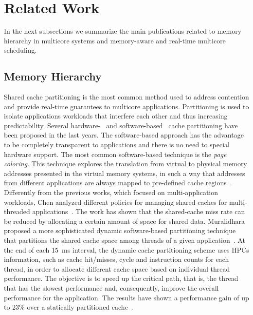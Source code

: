 \documentclass[conference]{IEEEtran}
\begin{document}
\section{Related Work}
\label{sec:related}

In the next subsections we summarize the main publications related to memory hierarchy in multicore systems and memory-aware and real-time multicore scheduling.

\subsection{Memory Hierarchy}

Shared cache partitioning is the most common method used to address contention and provide real-time guarantees to multicore applications. Partitioning is used to isolate applications workloads that interfere each other and thus increasing predictability. Several hardware-~\cite{Suhendra2008} and software-based~\cite{Cho:2006b, Zhang:2009, Muralidhara:2010} cache partitioning have been proposed in the last years. The software-based approach has the advantage to be completely transparent to applications and there is no need to special hardware support. The most common software-based technique is the \emph{page coloring}. This technique explores the translation from virtual to physical memory addresses presented in the virtual memory systems, in such a way that addresses from different applications are always mapped to pre-defined cache regions~\cite{Liedtke:1997, Cho:2006b}. Differently from the previous works, which focused on multi-application workloads, Chen analyzed different policies for managing shared caches for multi-threaded applications~\cite{YuChen:2009}. The work has shown that the shared-cache miss rate can be reduced by allocating a certain amount of space for shared data. Muralidhara proposed a more sophisticated dynamic software-based partitioning technique that partitions the shared cache space among threads of a given application~\cite{Muralidhara:2010}. At the end of each 15~ms interval, the dynamic cache partitioning scheme uses HPCs information, such as cache hit/misses, cycle and instruction counts for each thread, in order to allocate different cache space based on individual thread performance. The objective is to speed up the critical path, that is, the thread that has the slowest performance and, consequently, improve the overall performance for the application. The results have shown a performance gain of up to 23\% over a statically partitioned cache~\cite{Muralidhara:2010}. 
\end{document}
